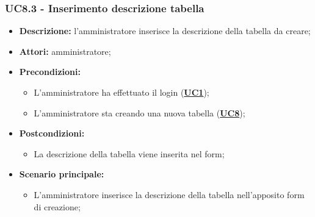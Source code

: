 \documentclass[5pt]{article}
\begin{document}
\subsubsection{UC8.3 - Inserimento descrizione tabella}
\label{sec:UC8.3}
\begin{itemize}
	\item \textbf{Descrizione:} l’amministratore inserisce la descrizione della tabella da creare;
	\item \textbf{Attori:} amministratore;
	\item \textbf{Precondizioni:} 
	\begin{itemize}
		\item L’amministratore ha effettuato il login (\hyperref[sec:UC1]{\textbf{UC1}});
		\item L’amministratore sta creando una nuova tabella (\hyperref[sec:UC1]{\textbf{UC8}});
	\end{itemize}
	\item \textbf{Postcondizioni:} 
	\begin{itemize}
		\item La descrizione della tabella viene inserita nel form;
	\end{itemize}
	\item \textbf{Scenario principale:} 
	\begin{itemize}
		\item L’amministratore inserisce la descrizione della tabella nell'apposito form di creazione;
	\end{itemize}
\end{itemize}
\end{document}
